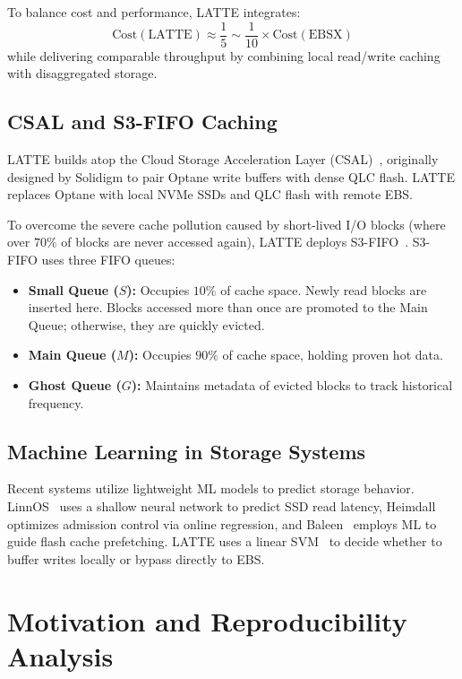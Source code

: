 \documentclass[10pt,twocolumn]{article}
\begin{document}
To balance cost and performance, LATTE integrates:
\begin{equation}
    \text{Cost}(\text{LATTE}) \approx \frac{1}{5} \sim \frac{1}{10} \times \text{Cost}(\text{EBSX})
\end{equation}
while delivering comparable throughput by combining local read/write caching with disaggregated storage.

\subsection{CSAL and S3-FIFO Caching}
LATTE builds atop the Cloud Storage Acceleration Layer (CSAL)~\cite{zhou2024csal}, originally designed by Solidigm to pair Optane write buffers with dense QLC flash. LATTE replaces Optane with local NVMe SSDs and QLC flash with remote EBS. 

To overcome the severe cache pollution caused by short-lived I/O blocks (where over $70\%$ of blocks are never accessed again), LATTE deploys S3-FIFO~\cite{yang2023fifo}. S3-FIFO uses three FIFO queues:
\begin{itemize}
    \item \textbf{Small Queue ($S$):} Occupies $10\%$ of cache space. Newly read blocks are inserted here. Blocks accessed more than once are promoted to the Main Queue; otherwise, they are quickly evicted.
    \item \textbf{Main Queue ($M$):} Occupies $90\%$ of cache space, holding proven hot data.
    \item \textbf{Ghost Queue ($G$):} Maintains metadata of evicted blocks to track historical frequency.
\end{itemize}

\subsection{Machine Learning in Storage Systems}
Recent systems utilize lightweight ML models to predict storage behavior. LinnOS~\cite{hao2020linnos} uses a shallow neural network to predict SSD read latency, Heimdall~\cite{kurniawan2025heimdall} optimizes admission control via online regression, and Baleen~\cite{wong2024baleen} employs ML to guide flash cache prefetching. LATTE uses a linear SVM~\cite{fan2008liblinear} to decide whether to buffer writes locally or bypass directly to EBS.

\section{Motivation and Reproducibility Analysis}
\end{document}
